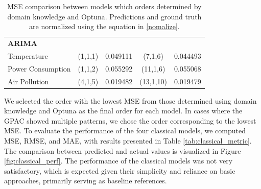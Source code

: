 \documentclass[sn-mathphys-num]{sn-jnl}
\theoremstyle{thmstyleone}%
\theoremstyle{thmstyletwo}%
\theoremstyle{thmstylethree}%
\begin{document}
\begin{table}[h]
\begin{tabular}{@{}lcccc@{}}
\textbf{ARIMA}            &                                 &                  &                       &                  \\
Temperature             & (1,1,1)                         & 0.049111         & (7,1,6)               & 0.044493         \\
Power Consumption       & (1,1,2)                         & 0.055292         & (11,1,6)              & 0.055068         \\
Air Pollution           & (4,1,5)                         & 0.019482         & (13,1,10)             & 0.019479         \\ \bottomrule
\end{tabular}
\caption{MSE comparison between models which orders determined by domain knowledge and Optuna. Predictions and ground truth are normalized using the equation in \ref{nomalize}.}
\label{tab:optuna}
\end{table}
We selected the order with the lowest MSE from those determined using domain knowledge and Optuna as the final order for each model. In cases where the GPAC showed multiple patterns, we chose the order corresponding to the lowest MSE. To evaluate the performance of the four classical models, we computed MSE, RMSE, and MAE, with results presented in Table \ref{tab:classical_metric}. The comparison between predicted and actual values is visualized in Figure \ref{fig:classical_perf}. The performance of the classical models was not very satisfactory, which is expected given their simplicity and reliance on basic approaches, primarily serving as baseline references.
\end{document}
